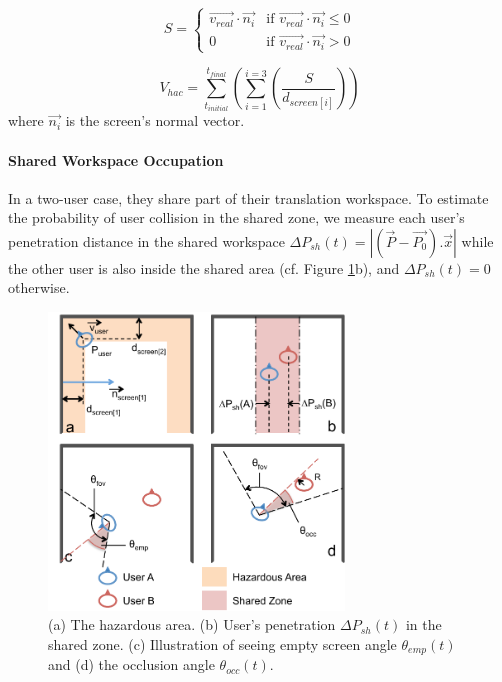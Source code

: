 \begin{equation}
S = 
  \begin{cases}
  \overrightarrow{v_{real}}\cdot\overrightarrow{n_{i}} & \text{if } \overrightarrow{v_{real}}\cdot\overrightarrow{n_{i}} \leq 0 \\
  0 & \text{if } \overrightarrow{v_{real}}\cdot\overrightarrow{n_{i}} > 0
  \end{cases}
\end{equation}

\begin{equation}
V_{hac}=\sum_{t_{initial}}^{t_{final}}\left(\sum_{i=1}^{i=3}\left(\frac{S}{d_{screen[i]}}\right)\right)
\end{equation}
where $\overrightarrow{n_{i}}$ is the screen's normal vector.


\paragraph{Shared Workspace Occupation}
In a two-user case, they share part of their translation workspace. To estimate the probability of user collision in the shared zone, we measure each user's penetration distance in the shared workspace $\Delta P_{sh}(t)=\left|(\overrightarrow{P}-\overrightarrow{P_{0}}).\overrightarrow{x}\right|$ while the other user is also inside the shared area (cf. Figure \ref{fig:4_metrics}b), and $\Delta P_{sh}(t)=0$ otherwise.

\begin{figure}[tb]
  \centering
  \includegraphics[width=0.7\textwidth]{figures/ch4/cohab_metrics}
  \caption{\label{fig:4_metrics}(a) The hazardous area. (b) User's penetration $\Delta P_{sh}(t)$ in the shared zone. (c) Illustration of seeing empty screen angle $\theta_{emp}(t)$ and (d) the occlusion angle $\theta_{occ}(t)$.}
\end{figure}

